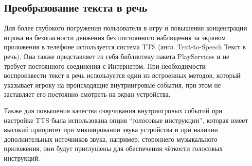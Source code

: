 \subsection*{Преобразование текста в речь}
Для более глубокого погружения пользователя в игру и повышения концентрации игрока на безопасности движения без постоянного наблюдения за экраном приложения в телефоне используется система TTS (англ. Text-to-Speech \textemdash\space Текст в речь). Она также представляет из себя библиотеку пакета PlayServices и не требует постоянного соединения с Интернетом. 
При необходимости воспроизвести текст в речь используется один из встроенных методов, который указывает игроку на происходящие внутриигровые события, при этом не заставляет его постоянно смотреть на экран устройства.


Также для повышения качества озвучивания внутриигровых событий при настройке TTS была использована опция ``голосовые инструкции'', которая имеет высокий приоритет при микшировании звука устройства и при наличии дополнительных источников звука, например, стороннего музыкального приложения, они будут приглушены для обеспечения чёткости голосовых инструкций.
